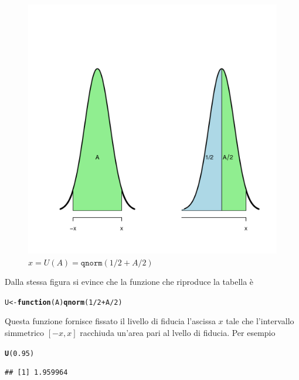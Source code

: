 \documentclass[onecolumn,12pt]{book}\usepackage[]{graphicx}\usepackage[]{color}
\makeatletter
\def\maxwidth{ %
  \ifdim\Gin@nat@width>\linewidth
    \linewidth
  \else
    \Gin@nat@width
  \fi
}
\newcommand{\hlnum}[1]{\textcolor[rgb]{0.686,0.059,0.569}{#1}}%
\newcommand{\hlopt}[1]{\textcolor[rgb]{0,0,0}{#1}}%
\newcommand{\hlstd}[1]{\textcolor[rgb]{0.345,0.345,0.345}{#1}}%
\newcommand{\hlkwa}[1]{\textcolor[rgb]{0.161,0.373,0.58}{\textbf{#1}}}%
\newcommand{\hlkwb}[1]{\textcolor[rgb]{0.69,0.353,0.396}{#1}}%
\newcommand{\hlkwc}[1]{\textcolor[rgb]{0.333,0.667,0.333}{#1}}%
\newcommand{\hlkwd}[1]{\textcolor[rgb]{0.737,0.353,0.396}{\textbf{#1}}}%
\newenvironment{kframe}{%
 \def\at@end@of@kframe{}%
 \ifinner\ifhmode%
  \def\at@end@of@kframe{\end{minipage}}%
  \begin{minipage}{\columnwidth}%
 \fi\fi%
 \def\FrameCommand##1{\hskip\@totalleftmargin \hskip-\fboxsep
 \colorbox{shadecolor}{##1}\hskip-\fboxsep
     \hskip-\linewidth \hskip-\@totalleftmargin \hskip\columnwidth}%
 \MakeFramed {\advance\hsize-\width
   \@totalleftmargin\z@ \linewidth\hsize
   \@setminipage}}%
 {\par\unskip\endMakeFramed%
 \at@end@of@kframe}
\newenvironment{knitrout}{}{} %
\makeatother
\begin{document}
\begin{figure}[H]
\begin{knitrout}
\color{fgcolor}
\includegraphics[width=\maxwidth]{figure/unnamed-chunk-145-1} 

\end{knitrout}
\caption{$x=U(A)=\texttt{qnorm}(1/2+A/2)$}
\label{fig:fig12code}
\end{figure}
Dalla stessa figura  si evince che la funzione che riproduce la tabella è
\begin{knitrout}
\color{fgcolor}\begin{kframe}
\begin{alltt}
\hlstd{U} \hlkwb{<-}\hlkwa{function} \hlstd{(}\hlkwc{A}\hlstd{)} \hlkwd{qnorm} \hlstd{(}\hlnum{1}\hlopt{/}\hlnum{2} \hlopt{+} \hlstd{A}\hlopt{/}\hlnum{2}\hlstd{)}
\end{alltt}
\end{kframe}
\end{knitrout}
Questa funzione fornisce fissato il livello di fiducia l'ascissa $x$  tale che l'intervallo simmetrico $[-x,x]$ racchiuda un'area pari al lvello di fiducia. Per esempio
\begin{knitrout}
\color{fgcolor}\begin{kframe}
\begin{alltt}
\hlkwd{U}\hlstd{(}\hlnum{0.95}\hlstd{)}
\end{alltt}
\begin{verbatim}
## [1] 1.959964
\end{verbatim}
\end{kframe}
\end{knitrout}
\end{document}
